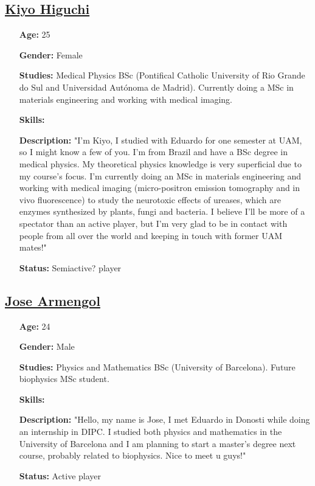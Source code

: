\documentclass[english,11pt]{article}
\theoremstyle{definition}
\theoremstyle{plain}
\begin{document}
\subsection*{\underline{Kiyo Higuchi}}
\begin{itemize}
\item[\textbf{Age:}] 25
\item[\textbf{Gender:}] Female
\item[\textbf{Studies:}] Medical Physics BSc (Pontifical Catholic University of Rio Grande do Sul and Universidad Autónoma de Madrid). Currently doing a MSc in materials engineering and working with medical imaging.
\item[\textbf{Skills:}] 
\item[\textbf{Description:}] "I'm Kiyo, I studied with Eduardo for one semester at UAM, so I might know a few of you. I'm from Brazil and have a BSc degree in medical physics. My theoretical physics knowledge is very superficial due to my course's focus. I'm currently doing an MSc in materials engineering and working with medical imaging (micro-positron emission tomography and in vivo fluorescence) to study the neurotoxic effects of ureases, which are enzymes synthesized by plants, fungi and bacteria. I believe I'll be more of a spectator than an active player, but I'm very glad to be in contact with people from all over the world and keeping in touch with former UAM mates!"
\item[\textbf{Status:}] Semiactive? player
\end{itemize}

\subsection*{\underline{Jose Armengol}}
\begin{itemize}
\item[\textbf{Age:}] 24
\item[\textbf{Gender:}] Male
\item[\textbf{Studies:}] Physics and Mathematics BSc (University of Barcelona). Future biophysics MSc student.
\item[\textbf{Skills:}] 
\item[\textbf{Description:}] "Hello, my name is Jose, I met Eduardo in Donosti while doing an internship in DIPC. I studied both physics and mathematics in the University of Barcelona and I am planning to start a master's degree next course, probably related to biophysics. Nice to meet u guys!"
\item[\textbf{Status:}] Active player
\end{itemize}
\end{document}
